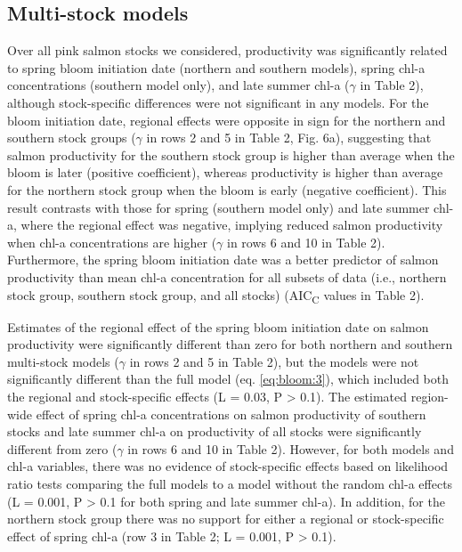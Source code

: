 \subsection{Multi-stock models}

Over all pink salmon stocks we considered, productivity was significantly
related to spring bloom initiation date (northern and southern models), spring
chl-a concentrations (southern model only), and late summer chl-a (\(\gamma\) in
Table 2), although stock-specific differences were not significant in any
models. For the bloom initiation date, regional effects were opposite in sign
for the northern and southern stock groups (\(\gamma\) in rows 2 and 5 in Table
2, Fig. 6a), suggesting that salmon productivity for the southern stock group is
higher than average when the bloom is later (positive coefficient), whereas
productivity is higher than average for the northern stock group when the bloom
is early (negative coefficient). This result contrasts with those for spring
(southern model only) and late summer chl-a, where the regional effect was
negative, implying reduced salmon productivity when chl-a concentrations are
higher (\(\gamma\) in rows 6 and 10 in Table 2). Furthermore, the spring bloom
initiation date was a better predictor of salmon productivity than mean chl-a
concentration for all subsets of data (i.e., northern stock group, southern
stock group, and all stocks) (AIC\textsubscript{C} values in Table 2).

Estimates of the regional effect of the spring bloom initiation date on salmon
productivity were significantly different than zero for both northern and
southern multi-stock models (\(\gamma\) in rows 2 and 5 in Table 2), but the
models were not significantly different than the full model (eq. \ref{eq:bloom:3}), which
included both the regional and stock-specific effects (L = 0.03, P
\textgreater{} 0.1). The estimated region-wide effect of spring chl-a
concentrations on salmon productivity of southern stocks and late summer chl-a
on productivity of all stocks were significantly different from zero (\(\gamma\)
in rows 6 and 10 in Table 2). However, for both models and chl-a variables,
there was no evidence of stock-specific effects based on likelihood ratio tests
comparing the full models to a model without the random chl-a effects (L =
0.001, P \textgreater{} 0.1 for both spring and late summer chl-a). In addition,
for the northern stock group there was no support for either a regional or
stock-specific effect of spring chl-a (row 3 in Table 2; L = 0.001, P
\textgreater{} 0.1).

